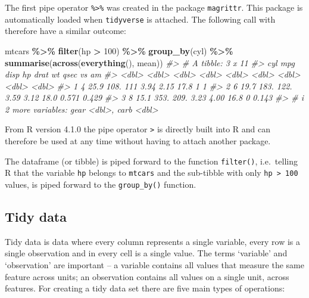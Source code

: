 \documentclass[
]{book}
\newenvironment{Shaded}{\begin{snugshade}}{\end{snugshade}}
\newcommand{\CommentTok}[1]{\textcolor[rgb]{0.56,0.35,0.01}{\textit{#1}}}
\newcommand{\DecValTok}[1]{\textcolor[rgb]{0.00,0.00,0.81}{#1}}
\newcommand{\FunctionTok}[1]{\textcolor[rgb]{0.13,0.29,0.53}{\textbf{#1}}}
\newcommand{\NormalTok}[1]{#1}
\newcommand{\SpecialCharTok}[1]{\textcolor[rgb]{0.81,0.36,0.00}{\textbf{#1}}}
\begin{document}
The first pipe operator \texttt{\%\textgreater{}\%} was created in the package \texttt{magrittr}. This package is automatically loaded when \texttt{tidyverse} is attached. The following call with therefore have a similar outcome:

\begin{Shaded}
\begin{Highlighting}[]
\NormalTok{mtcars }\SpecialCharTok{\%\textgreater{}\%}
  \FunctionTok{filter}\NormalTok{(hp }\SpecialCharTok{\textgreater{}} \DecValTok{100}\NormalTok{) }\SpecialCharTok{\%\textgreater{}\%}
  \FunctionTok{group\_by}\NormalTok{(cyl) }\SpecialCharTok{\%\textgreater{}\%}
  \FunctionTok{summarise}\NormalTok{(}\FunctionTok{across}\NormalTok{(}\FunctionTok{everything}\NormalTok{(), mean))}
\CommentTok{\#\textgreater{} \# A tibble: 3 x 11}
\CommentTok{\#\textgreater{}     cyl   mpg  disp    hp  drat    wt  qsec    vs    am}
\CommentTok{\#\textgreater{}   \textless{}dbl\textgreater{} \textless{}dbl\textgreater{} \textless{}dbl\textgreater{} \textless{}dbl\textgreater{} \textless{}dbl\textgreater{} \textless{}dbl\textgreater{} \textless{}dbl\textgreater{} \textless{}dbl\textgreater{} \textless{}dbl\textgreater{}}
\CommentTok{\#\textgreater{} 1     4  25.9  108.  111   3.94  2.15  17.8 1     1    }
\CommentTok{\#\textgreater{} 2     6  19.7  183.  122.  3.59  3.12  18.0 0.571 0.429}
\CommentTok{\#\textgreater{} 3     8  15.1  353.  209.  3.23  4.00  16.8 0     0.143}
\CommentTok{\#\textgreater{} \# i 2 more variables: gear \textless{}dbl\textgreater{}, carb \textless{}dbl\textgreater{}}
\end{Highlighting}
\end{Shaded}

From R version 4.1.0 the pipe operator \texttt{\textbar{}\textgreater{}} is directly built into R and can therefore be used at any time without having to attach another package.

The dataframe (or tibble) is piped forward to the function \texttt{filter()}, i.e.~telling R that the variable \texttt{hp} belongs to \texttt{mtcars} and the sub-tibble with only \texttt{hp\ \textgreater{}\ 100} values, is piped forward to the \texttt{group\_by()} function.

\subsection{Tidy data}\label{tidy-data}

Tidy data is data where every column represents a single variable, every row is a single observation and in every cell is a single value. The terms `variable' and `observation' are important -- a variable contains all values that measure the same feature across units; an observation contains all values on a single unit, across features. For creating a tidy data set there are five main types of operations:
\end{document}
